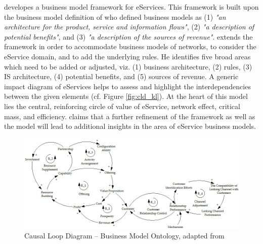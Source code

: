 \citet{Klueber2000} developes a business model framework for eServices. This framework is built upon the business model definition of \citet[p. 4]{Timmers1998} who defined business models as (1) \textit{"an architecture for the product, service and information flows"}, (2) \textit{"a description of potential benefits"}, and (3) \textit{"a description of the sources of revenue"}. \citet{Klueber2000} extends the framework in order to accommodate business models of networks, to consider the eService domain, and to add the underlying rules. He identifies five broad areas which need to be added or adjusted, viz. (1) business architecture, (2) rules, (3) \ac{IS} architecture, (4) potential benefits, and (5) sources of revenue. A generic impact diagram of eServices helps to assess and highlight the interdependencies between the given elements (cf. Figure \ref{fig:cld_kl}). At the heart of this model lies the central, reinforcing circle of value of eService, network effect, critical mass, and efficiency. \citet{Klueber2000} claims that a further refinement of the framework as well as the model will lead to additional insights in the area of eService business models. 

\begin{figure}[t]
	\centering
	\includegraphics[width=\textwidth]{gfx/cld_kiani}
	\caption[Causal Loop Diagram -- Business Model Ontology]{Causal Loop Diagram -- Business Model Ontology, adapted from \citet[p. 164]{Kiani2009}}
	\label{fig:cld_ki}
\end{figure}

